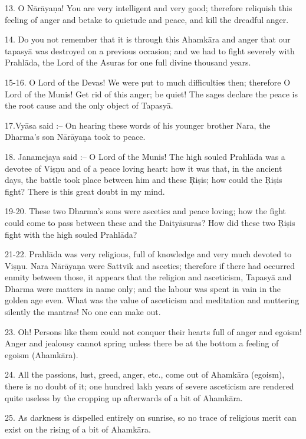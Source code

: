 13. O N\=ar\=aya\d{n}a! You are very intelligent and very good; therefore reliquish this feeling of anger and betake to quietude and peace, and kill the dreadful anger.

14. Do you not remember that it is through this Ahamk\=ara and anger that our tapasy\=a was destroyed on a previous occasion; and we had to fight severely with Prahl\=ada, the Lord of the Asuras for one full divine thousand years.

15-16. O Lord of the Devas! We were put to much difficulties then; therefore O Lord of the Munis! Get rid of this anger; be quiet! The sages declare the peace is the root cause and the only object of Tapasy\=a.

17.Vy\=asa said :-- On hearing these words of his younger brother Nara, the Dharma's son N\=ar\=aya\d{n}a took to peace.

18. Janamejaya said :-- O Lord of the Munis! The high souled Prahl\=ada was a devotee of Vi\d{s}\d{n}u and of a peace loving heart: how it was that, in the ancient days, the battle took place between him and these \d{R}i\d{s}is; how could the \d{R}i\d{s}is fight? There is this great doubt in my mind.

19-20. These two Dharma's sons were ascetics and peace loving; how the fight could come to pass between these and the Daity\=asuras? How did these two \d{R}i\d{s}is fight with the high souled Prahl\=ada?

21-22. Prahl\=ada was very religious, full of knowledge and very much devoted to Vi\d{s}\d{n}u. Nara N\=ar\=aya\d{n}a were Sattvik and ascetics; therefore if there had occurred enmity between those, it appears that the religion and asceticism, Tapasy\=a and Dharma were matters in name only; and the labour was spent in vain in the golden age even. What was the value of asceticism and meditation and muttering silently the mantras! No one can make out.

23. Oh! Persons like them could not conquer their hearts full of anger and egoism! Anger and jealousy cannot spring unless there be at the bottom a feeling of egoism (Ahamk\=ara).

24. All the passions, lust, greed, anger, etc., come out of Ahamk\=ara (egoism), there is no doubt of it; one hundred lakh years of severe asceticism are rendered quite useless by the cropping up afterwards of a bit of Ahamk\=ara.

25. As darkness is dispelled entirely on sunrise, so no trace of religious merit can exist on the rising of a bit of Ahamk\=ara.

